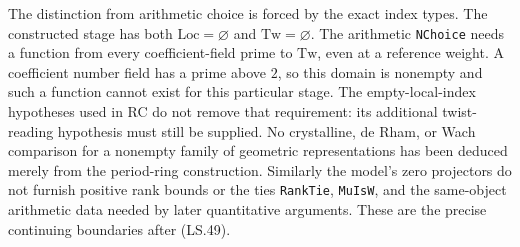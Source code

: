 The distinction from arithmetic choice is forced by the exact
index types. The constructed stage has both
$\mathrm{Loc}=\varnothing$ and $\mathrm{Tw}=\varnothing$.
The arithmetic \texttt{NChoice} needs a function from every
coefficient-field prime to $\mathrm{Tw}$, even at a reference
weight. A coefficient number field has a prime above $2$, so
this domain is nonempty and such a function cannot exist for
this particular stage. The empty-local-index hypotheses used in
RC do not remove that requirement: its additional twist-reading
hypothesis must still be supplied. No crystalline, de Rham, or
Wach comparison for a nonempty family of geometric representations
has been deduced merely from the period-ring construction.
Similarly the model's zero projectors do not furnish positive rank
bounds or the ties \texttt{RankTie}, \texttt{MuIsW}, and the
same-object arithmetic data needed by later quantitative arguments.
These are the precise continuing boundaries after (LS.49).
